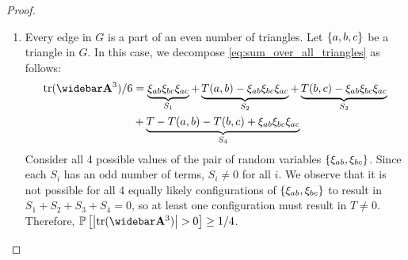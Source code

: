 \begin{proof}
\begin{enumerate}
\begin{enumerate}
            \item Every edge in $G$ is a part of an even number of triangles. Let $\left\{ a,b,c \right\}$ be a triangle in $G$. In this case, we decompose \eqref{eq:sum_over_all_triangles} as follows:
            \begin{align*}
                \trace{\As^3}/6 &= \underbrace{\rad_{ab} \rad_{bc} \rad_{ac}}_{S_1} +\underbrace{T(a,b) - \rad_{ab} \rad_{bc} \rad_{ac}}_{S_2} + \underbrace{T(b,c) - \rad_{ab} \rad_{bc} \rad_{ac}}_{S_3}  \\ &+\underbrace{T - T(a,b) - T(b,c) + \rad_{ab} \rad_{bc} \rad_{ac}}_{S_4}
            \end{align*}
            Consider all 4 possible values of the pair of random variables $\left\{ \xi_{ab}, \xi_{bc} \right\}$. Since each $S_i$ has an odd number of terms, $S_i \neq 0$ for all $i$. We observe that it is not possible for all 4 equally likely configurations of $\left\{ \xi_{ab}, \xi_{bc} \right\}$ to result in $S_1 + S_2 + S_3 + S_4 = 0$, so at least one configuration must result in $T \neq 0$. Therefore,  $\Prob{\abs{\trace{\As^3}} > 0} \geq 1/4$.
        \end{enumerate}
    \end{enumerate}
\end{proof}

